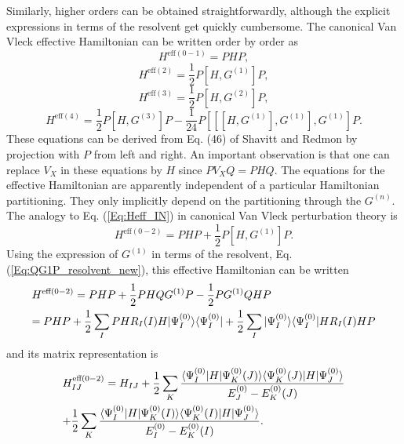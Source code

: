 Similarly, higher orders can be obtained straightforwardly, although the explicit expressions in terms of the resolvent get quickly cumbersome. The canonical Van Vleck effective Hamiltonian can be written order by order as
	\begin{equation}{H^{{\text{eff}}(0 - 1)}} = PHP,\end{equation}
	\begin{equation}{H^{{\text{eff}}(2)}} = \frac{1}{2}P[H,{G^{(1)}}]P,\end{equation}
	\begin{equation}{H^{{\text{eff}}(3)}} = \frac{1}{2}P[H,{G^{(2)}}]P,\end{equation}
	\begin{equation}{H^{{\text{eff}}(4)}} = \frac{1}{2}P[H,{G^{(3)}}]P - \frac{1}{{24}}P[[[H,{G^{(1)}}],{G^{(1)}}],{G^{(1)}}]P.\end{equation}
These equations can be derived from Eq. (46) of Shavitt and Redmon\cite{ShaviR_1980_5711} by projection with $P$ from left and right. An important observation is that one can replace ${V_X}$ in these equations by $H$ since $P{V_X}Q = PHQ$. The equations for the effective Hamiltonian are apparently independent of a particular Hamiltonian partitioning. They only implicitly depend on the partitioning through the ${G^{(n)}}$.
The analogy to Eq. (\ref{Eq:Heff_IN}) in canonical Van Vleck perturbation theory is\cite{ShaviR_1980_5711}
	\begin{equation}
	{H^{{\text{eff}}(0 - 2)}} = PHP + \frac{1}{2}P[H,{G^{(1)}}]P.
	\end{equation}
Using the expression of ${G^{(1)}}$ in terms of the resolvent, Eq. (\ref{Eq:QG1P_resolvent_new}), this effective Hamiltonian can be written
	\begin{equation}\begin{gathered}
  {H^{{\text{eff}}(0 - 2)}} = PHP + \frac{1}{2}PHQ{G^{(1)}}P - \frac{1}{2}P{G^{(1)}}QHP \hfill \\
   = PHP + \frac{1}{2}\sum\limits_I P H{R_I}(I)H|\Psi _I^{(0)}\rangle \langle \Psi _I^{(0)}| + \frac{1}{2}\sum\limits_I | \Psi _I^{(0)}\rangle \langle \Psi _I^{(0)}|H{R_I}(I)HP \hfill \\ 
\end{gathered} \end{equation}
and its matrix representation is
	\begin{equation}\begin{gathered}
  H_{IJ}^{{\text{eff}}(0 - 2)} = {H_{IJ}} + \frac{1}{2}\sum\limits_K {\frac{{\langle \Psi _I^{(0)}|H|\Psi _K^{(0)}(J)\rangle \langle \Psi _K^{(0)}(J)|H|\Psi _J^{(0)}\rangle }}{{E_J^{(0)} - E_K^{(0)}(J)}}}  \hfill \\
   + \frac{1}{2}\sum\limits_K {\frac{{\langle \Psi _I^{(0)}|H|\Psi _K^{(0)}(I)\rangle \langle \Psi _K^{(0)}(I)|H|\Psi _J^{(0)}\rangle }}{{E_I^{(0)} - E_K^{(0)}(I)}}} . \hfill \\ 
\end{gathered} \end{equation}
